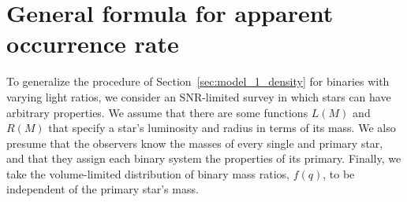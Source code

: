 \documentclass[12pt,modern]{aastex61}
\renewcommand{\a}{_{\rm a}}
\newcommand{\p}{_{\rm p}}
\begin{document}

\section{General formula for apparent occurrence rate}
\label{sec:general_formula}

To generalize the procedure of Section~\ref{sec:model_1_density} for
binaries with varying light ratios, we consider an SNR-limited survey
in which stars can have arbitrary properties.  We assume that there
are some functions $L(M)$ and $R(M)$ that specify a star's luminosity
and radius in terms of its mass. We also presume that the observers
know the masses of every single and primary star, and that they assign
each binary system the properties of its primary.  Finally, we take
the volume-limited distribution of binary mass ratios, $f(q)$, to be
independent of the primary star's mass.
\end{document}
